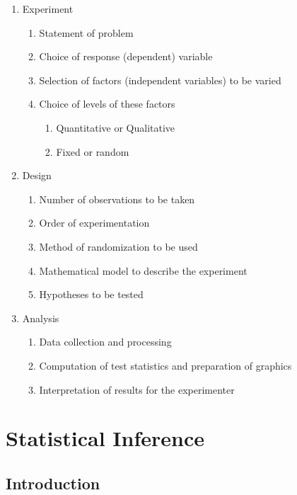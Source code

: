 \documentclass{WileySev}
\begin{document}
\begin{enumerate}
	\item Experiment
	\begin{enumerate}
	\item Statement of problem
    \item Choice of response (dependent) variable
    \item Selection of factors (independent variables) to be varied
    \item Choice of levels of these factors
    	\begin{enumerate}
    		\item Quantitative or Qualitative
		    \item Fixed or random
		\end{enumerate}
	\end{enumerate}
	\item Design
	\begin{enumerate}
		\item Number of observations to be taken
		\item Order of experimentation
		\item Method of randomization to be used
		\item Mathematical model to describe the experiment
		\item Hypotheses to be tested
	\end{enumerate}
	\item Analysis
	\begin{enumerate}
		\item Data collection and processing
		\item Computation of test statistics and preparation of graphics
		\item Interpretation of results for the experimenter
	\end{enumerate}
\end{enumerate}



\chapter[Statistical Inference]{Statistical Inference}

\section{Introduction}
\end{document}
